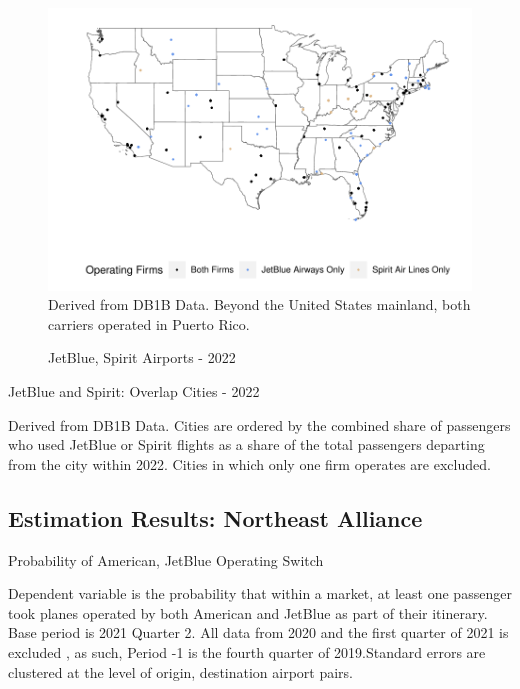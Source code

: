 \documentclass{article}
\begin{document}
\begin{appendices}
\begin{figure}
	\caption{JetBlue, Spirit Airports - 2022}
	\label{fig:JBSpirit_Airports_2022}
	\includegraphics[width = \linewidth]{Map_Mainland_Both_2022.pdf}
	\footnotesize{Derived from DB1B Data. Beyond the United States mainland, both carriers operated in Puerto Rico.}
\end{figure}


	\begin{table}
		\caption{JetBlue and Spirit: Overlap Cities - 2022}
		\label{tab:KeyCities}
		
		\footnotesize{Derived from DB1B Data. Cities are ordered by the combined share of passengers who used JetBlue or Spirit flights as a share of the total passengers departing from the city within 2022. Cities in which only one firm operates are excluded.}
	\end{table}

	
	\FloatBarrier
	
	\subsection{Estimation Results: Northeast Alliance}

	\begin{table}
	\caption{Probability of American, JetBlue Operating Switch}
	\label{tab:NEA_Switch_Prob}
	
	\footnotesize{Dependent variable is the probability that within a market, at least one passenger took planes operated by both American and JetBlue as part of their itinerary. Base period is 2021 Quarter 2. All data from 2020 and the first quarter of 2021 is excluded , as such,  Period -1 is the fourth quarter of 2019.Standard errors are clustered at the level of origin, destination airport pairs.}
\end{table}
	

\end{appendices}
\end{document}
